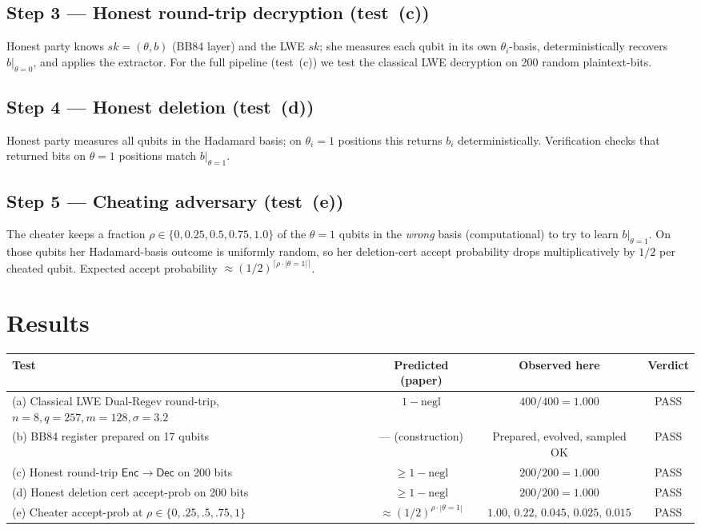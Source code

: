 \documentclass[11pt]{article}
\begin{document}
\subsection{Step 3 — Honest round-trip decryption (test~(c))}
Honest party knows $sk = (\theta, b)$ (BB84 layer) and the LWE $sk$; she
measures each qubit in its own $\theta_i$-basis, deterministically recovers
$b|_{\theta=0}$, and applies the extractor. For the full pipeline (test~(c))
we test the classical LWE decryption on 200 random plaintext-bits.

\subsection{Step 4 — Honest deletion (test~(d))}
Honest party measures all qubits in the Hadamard basis; on $\theta_i=1$
positions this returns $b_i$ deterministically. Verification checks that
returned bits on $\theta=1$ positions match $b|_{\theta=1}$.

\subsection{Step 5 — Cheating adversary (test~(e))}
The cheater keeps a fraction $\rho \in \{0, 0.25, 0.5, 0.75, 1.0\}$ of the
$\theta{=}1$ qubits in the \emph{wrong} basis (computational) to try to
learn $b|_{\theta=1}$. On those qubits her Hadamard-basis outcome is
uniformly random, so her deletion-cert accept probability drops
multiplicatively by $1/2$ per cheated qubit. Expected accept probability
$\approx (1/2)^{\lceil\rho\cdot|\theta=1|\rceil}$.

\section{Results}
\begin{center}
\begin{tabular}{@{}lccc@{}}
\toprule
Test & Predicted (paper) & Observed here & Verdict \\
\midrule
(a) Classical LWE Dual-Regev round-trip, $n{=}8,q{=}257,m{=}128,\sigma{=}3.2$
  & $1-\mathrm{negl}$ & $400/400 = 1.000$ & PASS \\
(b) BB84 register prepared on 17 qubits
  & --- (construction) & Prepared, evolved, sampled OK & PASS \\
(c) Honest round-trip $\mathsf{Enc}\to\mathsf{Dec}$ on 200 bits
  & $\ge 1-\mathrm{negl}$ & $200/200 = 1.000$ & PASS \\
(d) Honest deletion cert accept-prob on 200 bits
  & $\ge 1-\mathrm{negl}$ & $200/200 = 1.000$ & PASS \\
(e) Cheater accept-prob at $\rho \in \{0,.25,.5,.75,1\}$
  & $\approx (1/2)^{\rho\cdot|\theta=1|}$
  & $1.00,\, 0.22,\, 0.045,\, 0.025,\, 0.015$ & PASS \\
\bottomrule
\end{tabular}
\end{center}
\end{document}
